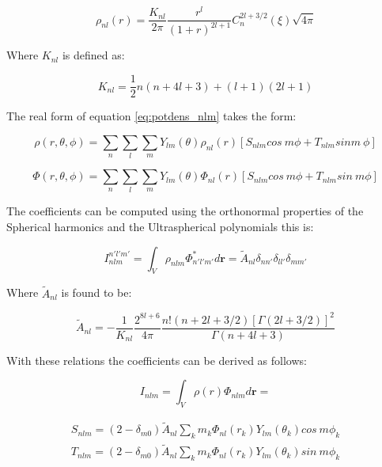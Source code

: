 \documentclass[14pt]{article}
\begin{document}
\begin{equation}
  \rho_{nl}(r) = \dfrac{K_{nl}}{2\pi}\dfrac{r^l}{(1+r)^{2l+1}}C_{n}^{2l+3/2}(\xi)\sqrt{4\pi}
\end{equation}


Where $K_{nl}$ is defined as:

\begin{equation}
    K_{nl}=\dfrac{1}{2}n(n+4l+3) +(l+1)(2l+1)
\end{equation}

The real form of equation \ref{eq:potdens_nlm} takes the form: 

\begin{equation}
  \rho(r, \theta, \phi) = \sum_{n} \sum_l \sum_m Y_{lm}(\theta) \rho_{nl}(r)
  \left[ S_{nlm} cos\ m \phi + T_{nlm} sin m\ \phi \right]
\end{equation}


\begin{equation}
  \Phi(r, \theta, \phi) = \sum_{n} \sum_l \sum_m Y_{lm}(\theta) \Phi_{nl}(r)
  \left[ S_{nlm} cos\ m\phi + T_{nlm} sin\ m \phi \right]
\end{equation}


The coefficients can be computed using the orthonormal properties of the
Spherical harmonics and the Ultraspherical polynomials this is:

\begin{equation}\label{eq:energy}
  I_{nlm}^{n'l'm'} = \int_V \rho_{nlm} \Phi_{n'l'm'}^*  d\textbf{r} = \tilde{A}_{nl} \delta_{nn'}
  \delta_{ll'} \delta_{mm'} 
\end{equation}

Where $\tilde{A}_{nl}$ is found to be:

\begin{equation}
    \tilde{A}_{nl} = - \frac{1}{K_{nl}}\frac{2^{8l+6}}{4\pi}\frac{n!(n+2l+3/2)[\Gamma(2l+3/2)]^2}{\Gamma(n+4l+3)}
\end{equation}

With these relations the coefficients can be derived as follows:

\begin{equation}\label{eq:coefficients}
  I_{nlm} = \int_V \rho(r) \Phi_{nlm} d\textbf{r} = 
\end{equation}


\begin{equation}
  \begin{aligned}
    S_{nlm} = (2-\delta_{m0})\tilde{A}_{nl} \sum_k m_k
  \Phi_{nl}(r_k)Y_{lm}(\theta_k) cos\ m\phi_k \\
    T_{nlm} = (2-\delta_{m0})\tilde{A}_{nl} \sum_k m_k 
  \Phi_{nl}(r_k)Y_{lm}(\theta_k) sin\ m\phi_k 
  \end{aligned}
\end{equation}
\end{document}
